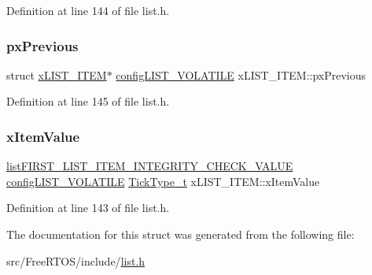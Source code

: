 Definition at line 144 of file list.\+h.

\mbox{\label{structx_l_i_s_t___i_t_e_m_ae8e553eae41010a8e41c66d76c94110b}} 
\subsubsection{\texorpdfstring{px\+Previous}{pxPrevious}}
{\footnotesize\ttfamily struct \hyperlink{structx_l_i_s_t___i_t_e_m}{x\+L\+I\+S\+T\+\_\+\+I\+T\+EM}$\ast$ \hyperlink{list_8h_a2d5de557c5561c8980d1bf51d87d8cba}{config\+L\+I\+S\+T\+\_\+\+V\+O\+L\+A\+T\+I\+LE} x\+L\+I\+S\+T\+\_\+\+I\+T\+E\+M\+::px\+Previous}



Definition at line 145 of file list.\+h.

\mbox{\label{structx_l_i_s_t___i_t_e_m_a9b1f26de79f9da1403ca3ebc7a2e653a}} 
\subsubsection{\texorpdfstring{x\+Item\+Value}{xItemValue}}
{\footnotesize\ttfamily \hyperlink{list_8h_a3611bd5d5d87cb26ac1dc7a4852b94a0}{list\+F\+I\+R\+S\+T\+\_\+\+L\+I\+S\+T\+\_\+\+I\+T\+E\+M\+\_\+\+I\+N\+T\+E\+G\+R\+I\+T\+Y\+\_\+\+C\+H\+E\+C\+K\+\_\+\+V\+A\+L\+UE} \hyperlink{list_8h_a2d5de557c5561c8980d1bf51d87d8cba}{config\+L\+I\+S\+T\+\_\+\+V\+O\+L\+A\+T\+I\+LE} \hyperlink{portmacro_8h_aa69c48c6e902ce54f70886e6573c92a9}{Tick\+Type\+\_\+t} x\+L\+I\+S\+T\+\_\+\+I\+T\+E\+M\+::x\+Item\+Value}



Definition at line 143 of file list.\+h.



The documentation for this struct was generated from the following file\+:\begin{DoxyCompactItemize}
\item 
src/\+Free\+R\+T\+O\+S/include/\hyperlink{list_8h}{list.\+h}\end{DoxyCompactItemize}
